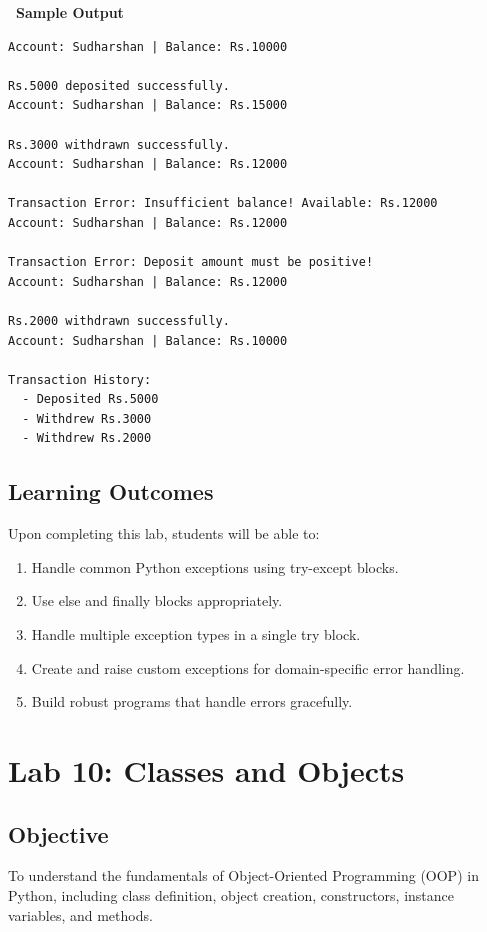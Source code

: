 \documentclass[12pt,a4paper]{article}
\newcommand{\outhead}{\noindent\colorbox{cmrgreen!25}%
  {\textbf{\small\color{cmrdark}~Sample Output~}}\par\vspace{-1pt}}
\begin{document}
\outhead
\begin{lstlisting}[style=outputstyle]
Account: Sudharshan | Balance: Rs.10000

Rs.5000 deposited successfully.
Account: Sudharshan | Balance: Rs.15000

Rs.3000 withdrawn successfully.
Account: Sudharshan | Balance: Rs.12000

Transaction Error: Insufficient balance! Available: Rs.12000
Account: Sudharshan | Balance: Rs.12000

Transaction Error: Deposit amount must be positive!
Account: Sudharshan | Balance: Rs.12000

Rs.2000 withdrawn successfully.
Account: Sudharshan | Balance: Rs.10000

Transaction History:
  - Deposited Rs.5000
  - Withdrew Rs.3000
  - Withdrew Rs.2000
\end{lstlisting}

\subsection{Learning Outcomes}
Upon completing this lab, students will be able to:
\begin{enumerate}
  \item Handle common Python exceptions using try-except blocks.
  \item Use else and finally blocks appropriately.
  \item Handle multiple exception types in a single try block.
  \item Create and raise custom exceptions for domain-specific error handling.
  \item Build robust programs that handle errors gracefully.
\end{enumerate}

\newpage

\section{Lab 10: Classes and Objects}

\subsection{Objective}
To understand the fundamentals of Object-Oriented Programming (OOP) in Python, including class definition, object creation, constructors, instance variables, and methods.
\end{document}
